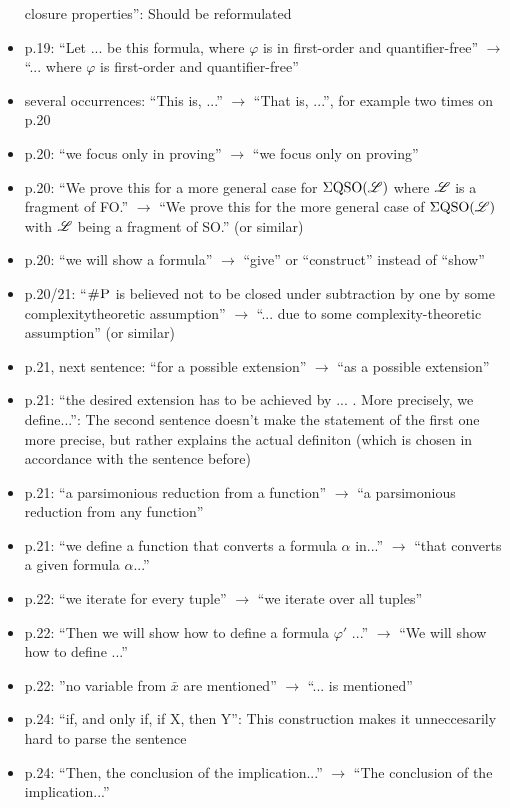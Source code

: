 \begin{itemize}
	closure properties'': Should be reformulated
	\item p.19: ``Let ... be this formula, where $\varphi$ is in first-order and quantifier-free'' $\to$ ``... where $\varphi$ is
	first-order and quantifier-free''
	\item several occurrences: ``This is, ...'' $\to$ ``That is, ...'', for example two times on p.20
	\item p.20: ``we focus only in proving'' $\to$ ``we focus only on proving''
	\item p.20: ``We prove this for a more general case for $\Sigma{\rm QSO}(\mathscr{L})$ where $\mathscr{L}$ is a fragment of FO.''
	$\to$ ``We prove this for the more general case of $\Sigma{\rm QSO}(\mathscr{L})$ with $\mathscr{L}$ being a fragment of SO.''
	(or similar)
	
	\item p.20: ``we will show a formula'' $\to$ ``give'' or ``construct'' instead of ``show''
	\item p.20/21: ``$\text{\sc \#P}$ is believed not to be closed under subtraction by one by some complexitytheoretic
	assumption'' $\to$ ``... due to some complexity-theoretic assumption'' (or similar)
	\item p.21, next sentence: ``for a possible extension'' $\to$ ``as a possible extension''
	\item p.21: ``the desired extension has to be achieved by ... . More precisely, we define...'': The second
	sentence doesn’t make the statement of the first one more precise, but rather explains the
	actual definiton (which is chosen in accordance with the sentence before)
	\item p.21: ``a parsimonious reduction from a function'' $\to$ ``a parsimonious reduction from any
	function''
	\item p.21: ``we define a function that converts a formula $\alpha$ in...'' $\to$ ``that converts a given formula
	$\alpha$...''
	\item p.22: ``we iterate for every tuple'' $\to$ ``we iterate over all tuples''
	\item p.22: ``Then we will show how to define a formula $\varphi'$
	...'' $\to$ ``We will show how to define ...''
	\item p.22: ''no variable from $\bar{x}$ are mentioned'' $\to$ ``... is mentioned''
	\item p.24: ``if, and only if, if X, then Y'': This construction makes it unneccesarily hard to parse
	the sentence
	\item p.24: ``Then, the conclusion of the implication...'' $\to$ ``The conclusion of the implication...''

\end{itemize}
